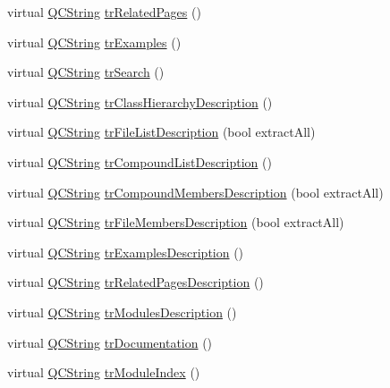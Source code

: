 \begin{DoxyCompactItemize}
virtual \hyperlink{class_q_c_string}{Q\-C\-String} \hyperlink{class_translator_ukrainian_a8ed40826492d6303375b3031fc88d3b2}{tr\-Related\-Pages} ()
\item 
virtual \hyperlink{class_q_c_string}{Q\-C\-String} \hyperlink{class_translator_ukrainian_a29f3ce9451daa973dcde36e7d0cab549}{tr\-Examples} ()
\item 
virtual \hyperlink{class_q_c_string}{Q\-C\-String} \hyperlink{class_translator_ukrainian_a6a284cb12ea8d274211aa42dad4654c4}{tr\-Search} ()
\item 
virtual \hyperlink{class_q_c_string}{Q\-C\-String} \hyperlink{class_translator_ukrainian_a7697957dd30cb62ae6635bdd99b828b3}{tr\-Class\-Hierarchy\-Description} ()
\item 
virtual \hyperlink{class_q_c_string}{Q\-C\-String} \hyperlink{class_translator_ukrainian_adca38ddeb72745fe24c61ff08af9e6c4}{tr\-File\-List\-Description} (bool extract\-All)
\item 
virtual \hyperlink{class_q_c_string}{Q\-C\-String} \hyperlink{class_translator_ukrainian_af008bc8cb43ee14946b1671d80099a34}{tr\-Compound\-List\-Description} ()
\item 
virtual \hyperlink{class_q_c_string}{Q\-C\-String} \hyperlink{class_translator_ukrainian_ab5fb09f47fa021d41e036d9f41bf741a}{tr\-Compound\-Members\-Description} (bool extract\-All)
\item 
virtual \hyperlink{class_q_c_string}{Q\-C\-String} \hyperlink{class_translator_ukrainian_a209311e74b83f8ac8eba8581d8a89eb9}{tr\-File\-Members\-Description} (bool extract\-All)
\item 
virtual \hyperlink{class_q_c_string}{Q\-C\-String} \hyperlink{class_translator_ukrainian_a0085d1262f19b68fdad2ad542f24914e}{tr\-Examples\-Description} ()
\item 
virtual \hyperlink{class_q_c_string}{Q\-C\-String} \hyperlink{class_translator_ukrainian_a9343c5fac5dbcf77ba7c31a80cb74846}{tr\-Related\-Pages\-Description} ()
\item 
virtual \hyperlink{class_q_c_string}{Q\-C\-String} \hyperlink{class_translator_ukrainian_aafdd368977a57dc31d200e624a1358ac}{tr\-Modules\-Description} ()
\item 
virtual \hyperlink{class_q_c_string}{Q\-C\-String} \hyperlink{class_translator_ukrainian_abde5870e18c641cdd9104c08a5cb42e7}{tr\-Documentation} ()
\item 
virtual \hyperlink{class_q_c_string}{Q\-C\-String} \hyperlink{class_translator_ukrainian_ac13cd71aaccdf563fb4b51179c6c3254}{tr\-Module\-Index} ()

\end{DoxyCompactItemize}
